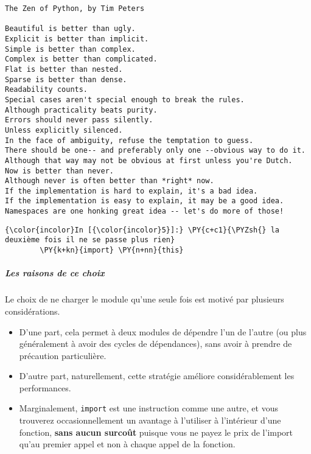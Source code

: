     \begin{Verbatim}[commandchars=\\\{\},frame=single,framerule=0.3mm,rulecolor=\color{cellframecolor}]
The Zen of Python, by Tim Peters

Beautiful is better than ugly.
Explicit is better than implicit.
Simple is better than complex.
Complex is better than complicated.
Flat is better than nested.
Sparse is better than dense.
Readability counts.
Special cases aren't special enough to break the rules.
Although practicality beats purity.
Errors should never pass silently.
Unless explicitly silenced.
In the face of ambiguity, refuse the temptation to guess.
There should be one-- and preferably only one --obvious way to do it.
Although that way may not be obvious at first unless you're Dutch.
Now is better than never.
Although never is often better than *right* now.
If the implementation is hard to explain, it's a bad idea.
If the implementation is easy to explain, it may be a good idea.
Namespaces are one honking great idea -- let's do more of those!
\end{Verbatim}

    \begin{Verbatim}[commandchars=\\\{\},frame=single,framerule=0.3mm,rulecolor=\color{cellframecolor}]
{\color{incolor}In [{\color{incolor}5}]:} \PY{c+c1}{\PYZsh{} la deuxième fois il ne se passe plus rien}
        \PY{k+kn}{import} \PY{n+nn}{this}
\end{Verbatim}


    \hypertarget{les-raisons-de-ce-choix}{%
\subparagraph{Les raisons de ce choix}\label{les-raisons-de-ce-choix}}

    Le choix de ne charger le module qu'une seule fois est motivé par
plusieurs considérations.

    \begin{itemize}
\tightlist
\item
  D'une part, cela permet à deux modules de dépendre l'un de l'autre (ou
  plus généralement à avoir des cycles de dépendances), sans avoir à
  prendre de précaution particulière.
\end{itemize}

    \begin{itemize}
\tightlist
\item
  D'autre part, naturellement, cette stratégie améliore considérablement
  les performances.
\end{itemize}

    \begin{itemize}
\tightlist
\item
  Marginalement, \texttt{import} est une instruction comme une autre, et
  vous trouverez occasionnellement un avantage à l'utiliser à
  l'intérieur d'une fonction, \textbf{sans aucun surcoût} puisque vous
  ne payez le prix de l'import qu'au premier appel et non à chaque appel
  de la fonction.
\end{itemize}

